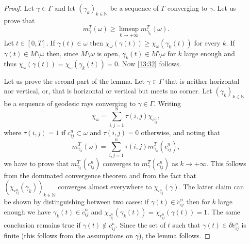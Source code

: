 \documentclass[10pt]{amsart}
\def\N{\mathbb{N}}
\theoremstyle{definition}
\begin{document}
\begin{proof}
{Let $\gamma\in\Gamma$ and let $(\gamma_k)_{k\in\N}$ be a sequence of $\Gamma$ converging to $\gamma$. Let us prove that
\begin{equation}\label{13:32}
m_\gamma^T(\omega) \geq \limsup_{k\rightarrow+\infty} m_{\gamma_k}^T(\omega).
\end{equation}
Let $t\in[0,T]$. If $\gamma(t)\in\omega$ then $\chi_\omega(\gamma(t)) \geq \chi_\omega(\gamma_k(t))$ for every $k$. If $\gamma(t)\in M\setminus\omega$ then, since $M\setminus\omega$ is open, $\gamma_k(t)\in M\setminus\omega$ for $k$ large enough and thus $\chi_\omega(\gamma(t)) = \chi_\omega(\gamma_k(t)) = 0$. Now \eqref{13:32} follows.
}

Let us prove the second part of the lemma.
Let $\gamma\in\Gamma$ that is neither horizontal nor vertical, or, that is horizontal or vertical but meets no corner. Let $(\gamma_k)_{k\in \N}$ be a sequence of geodesic rays converging to $\gamma\in \Gamma$.
Writing
\[
\chi_{\omega}=\sum_{i,j=1}^n\tau(i,j)\chi_{c_{ij}^n},
\]
where $\tau(i,j)=1$ if $c_{ij}^n\subset \omega$ and $\tau(i,j)=0$ otherwise, and noting that
\[
m^T_{\gamma_k}(\omega)=\sum_{i,j=1}^n\tau(i,j)m^T_{\gamma_k}(c_{ij}^n),
\]
we have to prove that $m^T_{\gamma_k}(c_{ij}^n)$ converges to $m^T_{\gamma}(c_{ij}^n)$ as $k\rightarrow+\infty$. This follows from the dominated convergence theorem and from the fact that $(\chi_{c_{ij}^n}(\gamma_k) )_{k\in \N}$ converges almost everywhere to $\chi_{c_{ij}^n}(\gamma) $. The latter claim can be shown by distinguishing between two cases: if $\gamma(t)\in \mathring{c}_{ij}^n$ then for $k$ large enough we have $\gamma_k(t)\in \mathring{c}_{ij}^n$ and $\chi_{c_{ij}^n}(\gamma_k(t))=\chi_{c_{ij}^n}(\gamma(t))=1$. The same conclusion remains true if $\gamma(t)\notin c_{ij}^n$. Since the set of $t$ such that $\gamma(t)\in \partial c_{ij}^n$ is finite {(this follows from the assumptions on $\gamma$)},
the lemma follows.
\end{proof}
\end{document}
